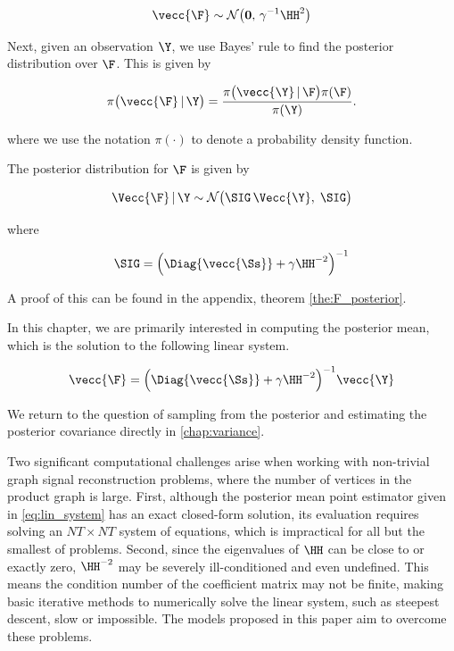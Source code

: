 \begin{equation}
    \label{eq:F_prior}
    \vecc{\F} \sim \mathcal{N}\big(\mathbf{0}, \, \gamma^{-1} \HH^2\big)
\end{equation}

Next, given an observation $\Y$, we use Bayes' rule to find the posterior distribution over $\F$. This is given by

\begin{equation}
    \pi\big(\vecc{\F} \, | \, \Y \big) = \frac{\pi\big(\vecc{\Y} \, | \, \F \big) \pi(\F) }{\pi(\Y)}.
\end{equation}

where we use the notation $\pi(\cdot)$ to denote a probability density function.

The posterior distribution for $\F$ is given by

\begin{equation}
    \label{eq:F_post}
    \Vecc{\F} \, | \, \Y \sim \mathcal{N} \big(\SIG \, \Vecc{\Y}, \; \SIG \big)
\end{equation}

\noindent where

\begin{equation}
    \label{eq:Sig_post}
    \SIG = \Big(\Diag{\vecc{\Ss}} + \gamma  \HH^{-2}\Big)^{-1}
\end{equation}

A proof of this can be found in the appendix, theorem \ref{the:F_posterior}.



In this chapter, we are primarily interested in computing the posterior mean, which is the solution to the following linear system.

\begin{equation}
    \label{eq:lin_system}
    \vecc{\F} = \Big(\Diag{\vecc{\Ss}} + \gamma  \HH^{-2}\Big)^{-1} \vecc{\Y}
\end{equation}

We return to the question of sampling from the posterior and estimating the posterior covariance directly in \cref{chap:variance}.

Two significant computational challenges arise when working with non-trivial graph signal reconstruction problems, where the number of vertices in the product graph is large. First, although the posterior mean point estimator given in \cref{eq:lin_system} has an exact closed-form solution, its evaluation requires solving an $NT \times NT$ system of equations, which is impractical for all but the smallest of problems. Second, since the eigenvalues of $\HH$ can be close to or exactly zero, $\HH^{-2}$ may be severely ill-conditioned and even undefined. This means the condition number of the coefficient matrix may not be finite, making basic iterative methods to numerically solve the linear system, such as steepest descent, slow or impossible. The models proposed in this paper aim to overcome these problems.


